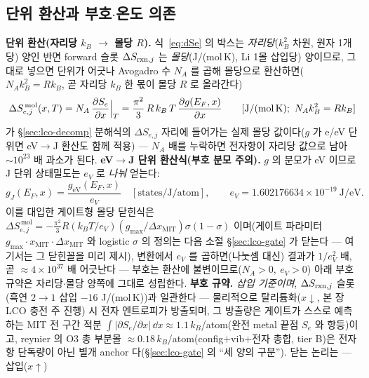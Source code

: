 \subsection{단위 환산과 부호$\cdot$온도 의존}\label{sec:lco-Se-units}
\textbf{단위 환산(자리당 $k_B$ $\to$ 몰당 $R$).} 식~\eqref{eq:dSe} 의 박스는 \emph{자리당}($k_B^2$ 차원, 원자 1개당) 양인 반면 forward 슬롯
$\Delta S_{\mathrm{rxn},j}$ 는 \emph{몰당}(J/(mol\,K), Li 1몰 삽입당) 양이므로, 그대로 넣으면 단위가 어긋나 Avogadro 수
$N_A$ 를 곱해 몰당으로 환산하면($N_A k_B^2=R k_B$, 곧 자리당 $k_B$ 한 몫이 몰당 $R$ 로 올라간다)
\begin{equation}
\Delta S_{e,j}^{\,\mathrm{mol}}(x,T)=N_A\,\frac{\partial S_e}{\partial x}\Big|_T
=\frac{\pi^2}{3}\,R\,k_B\,T\,\frac{\partial g(E_F,x)}{\partial x}
\qquad[\text{J/(mol\,K)};\ N_A k_B^2=R k_B]
\label{eq:dSemolar}
\end{equation}
가 \S\ref{sec:lco-decomp} 분해식의 $\Delta S_{e,j}$ 자리에 들어가는 실제 몰당 값이다($g$ 가 e/eV 단위면 eV$\to$J
환산도 함께 적용) --- $N_A$ 배를 누락하면 전자항이 자리당 값으로 남아 $\sim10^{23}$ 배 과소가 된다.
\textbf{eV$\to$J 단위 환산식(부호 분모 주의).} $g$ 의 분모가 eV 이므로 J 단위 상태밀도는 $e_V$ 로 \emph{나눠} 얻는다:
\begin{equation}
g_J(E_F,x)=\frac{g_{\mathrm{eV}}(E_F,x)}{e_V}\quad[\text{states/J/atom}],
\qquad e_V=1.602176634\times10^{-19}\ \text{J/eV}.
\label{eq:gunit}
\end{equation}
이를 대입한 게이트형 몰당 닫힌식은 $\Delta S_{e,j}^{\,\mathrm{mol}}=-\tfrac{\pi^2}{3}R(k_BT/e_V)(g_{\max}/
\Delta x_\mathrm{MIT})\sigma(1-\sigma)$ 이며(게이트 파라미터 $g_{\max}\cdot x_\mathrm{MIT}\cdot\Delta x_\mathrm{MIT}$
와 logistic $\sigma$ 의 정의는 다음 소절 \S\ref{sec:lco-gate} 가 닫는다 --- 여기서는 그 닫힌꼴을 미리 제시),
변환에서 $e_V$ 를 곱하면(나눗셈 대신) 결과가 $1/e_V^2$ 배, 곧
$\approx4\times10^{37}$ 배 어긋난다 --- 부호는
환산에 불변이므로($N_A>0,\ e_V>0$) 아래 부호 규약은 자리당$\cdot$몰당 양쪽에 그대로 성립한다. \textbf{부호 규약.} \emph{삽입 기준이며}, $\Delta S_{\mathrm{rxn},j}$ 슬롯(흑연 $2\!\to\!1$ 삽입 $-16$ J/(mol\,K))과 일관한다 --- 물리적으로
탈리튬화($x\!\downarrow$, 본 장 LCO 충전 주 진행) 시 전자 엔트로피가 방출되며, 그 방출량은 게이트가 스스로
예측하는 MIT 전 구간 적분 $\int|\partial S_e/\partial x|\,\dd x\approx1.1\,k_B$/atom(완전 metal 끝점 $S_e$ 와
항등)이고, reynier\cite{reynier2004} 의 O3 총 부분몰 $\approx0.18\,k_B$/atom(config$+$vib$+$전자 총합, tier B)은
전자항 단독량이 아닌 별개 anchor 다(\S\ref{sec:lco-gate} 의 ``세 양의 구분''). 닫는 논리는 --- 삽입($x\!\uparrow$)
